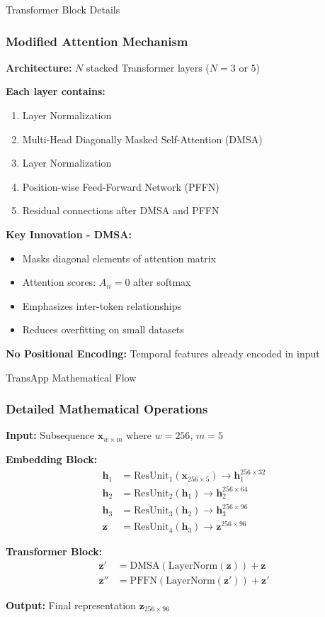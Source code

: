 \documentclass{beamer}
\begin{document}
\begin{frame}{Transformer Block Details}
\frametitle{Modified Attention Mechanism}

\textbf{Architecture:} $N$ stacked Transformer layers ($N = 3$ or $5$)

\textbf{Each layer contains:}
\begin{enumerate}
    \item Layer Normalization
    \item Multi-Head Diagonally Masked Self-Attention (DMSA)
    \item Layer Normalization
    \item Position-wise Feed-Forward Network (PFFN)
    \item Residual connections after DMSA and PFFN
\end{enumerate}

\vspace{0.3cm}

\textbf{Key Innovation - DMSA:}
\begin{itemize}
    \item Masks diagonal elements of attention matrix
    \item Attention scores: $A_{ii} = 0$ after softmax
    \item Emphasizes inter-token relationships
    \item Reduces overfitting on small datasets
\end{itemize}

\textbf{No Positional Encoding:} Temporal features already encoded in input
\end{frame}

\begin{frame}{TransApp Mathematical Flow}
\frametitle{Detailed Mathematical Operations}

\textbf{Input:} Subsequence $\mathbf{x}_{w \times m}$ where $w = 256$, $m = 5$

\textbf{Embedding Block:}
\begin{align}
\mathbf{h}_1 &= \text{ResUnit}_1(\mathbf{x}_{256 \times 5}) \rightarrow \mathbf{h}_1^{256 \times 32} \\
\mathbf{h}_2 &= \text{ResUnit}_2(\mathbf{h}_1) \rightarrow \mathbf{h}_2^{256 \times 64} \\
\mathbf{h}_3 &= \text{ResUnit}_3(\mathbf{h}_2) \rightarrow \mathbf{h}_3^{256 \times 96} \\
\mathbf{z} &= \text{ResUnit}_4(\mathbf{h}_3) \rightarrow \mathbf{z}^{256 \times 96}
\end{align}

\textbf{Transformer Block:}
\begin{align}
\mathbf{z}' &= \text{DMSA}(\text{LayerNorm}(\mathbf{z})) + \mathbf{z} \\
\mathbf{z}'' &= \text{PFFN}(\text{LayerNorm}(\mathbf{z}')) + \mathbf{z}'
\end{align}

\textbf{Output:} Final representation $\mathbf{z}_{256 \times 96}$
\end{frame}
\end{document}
